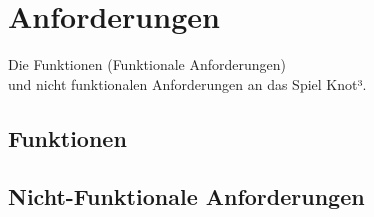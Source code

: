 %
%



%
%
\newcommand{\K}{}





%
%
%
%



\chapter{Anforderungen}
\label{AF}

Die Funktionen (Funktionale Anforderungen)\\und nicht funktionalen Anforderungen an das Spiel Knot³.\\


\section{Funktionen}
\label{AF:FA}

%
%
%




%
%
%
%
%


%
%
\clearpage


\section{Nicht-Funktionale Anforderungen}
\label{AF:NFA}~\\

